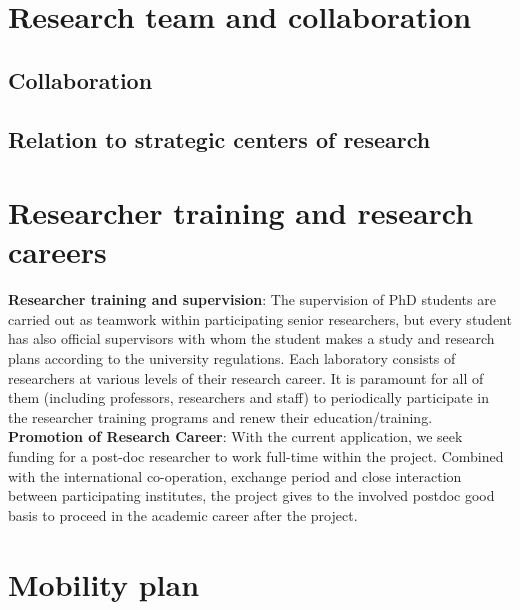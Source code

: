 \documentclass{article}
\begin{document}
\section{Research team and collaboration}

\subsection{Collaboration}

\subsection{Relation to strategic centers of research}

\section{Researcher training and research careers}
\textbf{Researcher training and supervision}: The supervision of PhD students are carried out as teamwork within participating senior researchers, 
but every student has also official supervisors with whom the student makes a study and research plans according to the university regulations. 
Each laboratory consists of researchers at various levels of their research career. 
It is paramount for all of them (including professors, researchers and staff) to periodically participate in the researcher training programs and renew their education/training.\\ 
\textbf{Promotion of Research Career}: With the current application, we seek funding for a post-doc researcher to work full-time within the project. 
Combined with the international co-operation, exchange period and close interaction between participating institutes, the project gives to the involved postdoc good basis to proceed in the academic career after the project.

\section{Mobility plan}





\end{document}
